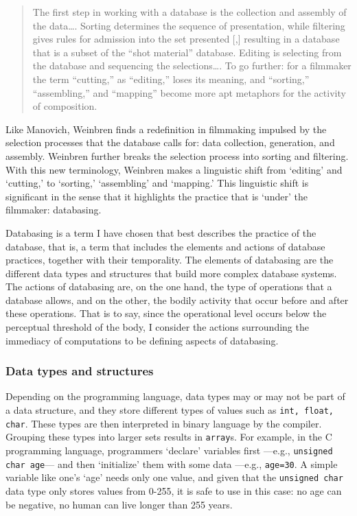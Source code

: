\begin{quote}
	The first step in working with a database is the collection and assembly of the data\dots. Sorting determines the sequence of presentation, while filtering gives rules for admission into the set presented [,] resulting in a database that is a subset of the ``shot material'' database. Editing is selecting from the database and sequencing the selections\dots. To go further: for a filmmaker the term ``cutting,'' as ``editing,'' loses its meaning, and ``sorting,'' ``assembling,'' and ``mapping'' become more apt metaphors for the activity of composition. \parencite[71]{Wei07:Oce}
\end{quote}

Like Manovich, Weinbren finds a redefinition in filmmaking impulsed by the selection processes that the database calls for: data collection, generation, and assembly. Weinbren further breaks the selection process into sorting and filtering. With this new terminology, Weinbren makes a linguistic shift from `editing' and `cutting,' to `sorting,' `assembling' and `mapping.' This linguistic shift is significant in the sense that it highlights the practice that is `under' the filmmaker: databasing. 

Databasing is a term I have chosen that best describes the practice of the database, that is, a term that includes the elements and actions of database practices, together with their temporality. The elements of databasing are the different data types and structures that build more complex database systems. The actions of databasing are, on the one hand, the type of operations that a database allows, and on the other, the bodily activity that occur before and after these operations. That is to say, since the operational level occurs below the perceptual threshold of the body, I consider the actions surrounding the immediacy of computations to be defining aspects of databasing.

\subsubsection{Data types and structures}

Depending on the programming language, data types may or may not be part of a data structure, and they store different types of values such as \texttt{int, float, char}. These types are then interpreted in binary language by the compiler. Grouping these types into larger sets results in \texttt{array}s. For example, in the C programming language, programmers `declare' variables first ---e.g., \texttt{unsigned char age}--- and then `initialize' them with some data ---e.g., \texttt{age=30}. A simple variable like one's `age' needs only one value, and given that the \texttt{unsigned char} data type only stores values from 0-255, it is safe to use in this case: no age can be negative, no human can live longer than 255 years.

